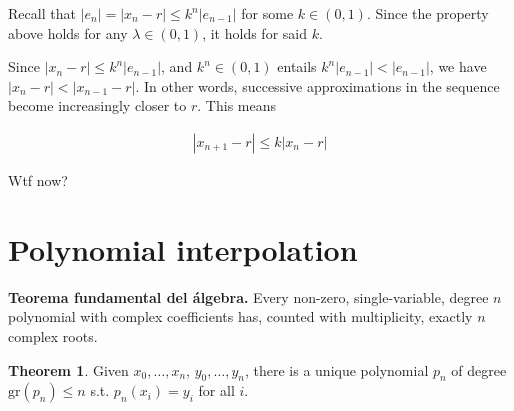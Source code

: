 \documentclass[12pt]{article}
\theoremstyle{definition}
\newtheorem{theorem}{Theorem}
\begin{document}
Recall that $\left| e_n \right| = \left| x_n - r \right| \leq k^n\left| e_{n-1}
\right|  $ for some $k \in (0, 1)$. Since the property above holds for any
$\lambda \in (0, 1)$, it holds for said $k$. 

Since $\left| x_n - r \right| \leq k^n \left| e_{n-1} \right| $, and $k^n \in
(0, 1)$ entails $k^n \left| e_{n-1} \right| < \left| e_{n-1} \right| $, we have 
$\left| x_n - r \right| < \left| x_{n-1} - r \right|  $. In other words,
successive approximations in the sequence become increasingly closer to $r$.
This means

\begin{align*}
    \left| x_{n+1} - r \right| \leq k \left| x_n - r \right| 
\end{align*}

Wtf now? 

\pagebreak 

\section{Polynomial interpolation}

\begin{shaded}
    \textbf{Teorema fundamental del álgebra.}  Every non-zero, single-variable,
    degree $n$ polynomial with complex coefficients has, counted with
    multiplicity, exactly $n$ complex roots.
\end{shaded}

\begin{theorem}
    Given $x_0, \ldots, x_n$, $y_0, \ldots, y_n$, there is a unique polynomial
    $p_n$ of degree $\text{gr}(p_n) \leq n$ s.t. $p_n(x_i) = y_i$ for all $i$.
\end{theorem}
\end{document}
